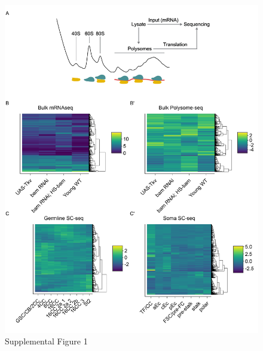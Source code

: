 \documentclass[
]{article}
\begin{document}
\begin{figure}
\centering
\includegraphics{Supplemental_Figure1.pdf}
\caption{Supplemental Figure 1}
\end{figure}
\end{document}
